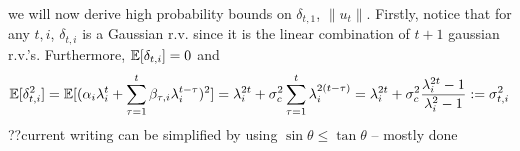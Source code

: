 \documentclass[10pt]{article}
\begin{document}

we will now derive high probability bounds on $\delta_{t,1}$, $\|u_t\|$. Firstly, notice that for any $t,i$, $\delta_{t,i}$ is a Gaussian r.v. since it is the linear combination of $t+1$ gaussian r.v.'s. Furthermore, $\mathbb{E}[\delta_{t,i}] = 0$ and 
\begin{align*}
\mathbb{E}[\delta_{t,i}^2] = \mathbb{E}[(\alpha_i \lambda_i^t + \sum_{\tau=1}^t \beta_{\tau,i} \lambda_i^{t-\tau})^2] = \lambda_i^{2t} + \sigma_c^2 \sum_{\tau=1}^t \lambda_i^{2(t-\tau)} = \lambda_i^{2t} + \sigma_c^2 \frac{\lambda_i^{2t}-1}{\lambda_i^2-1} := \sigma_{t,i}^2
\end{align*}
{\color{blue} \noindent ??current writing can be simplified by using $\sin \theta \leq \tan \theta $ -- mostly done}
\end{document}
